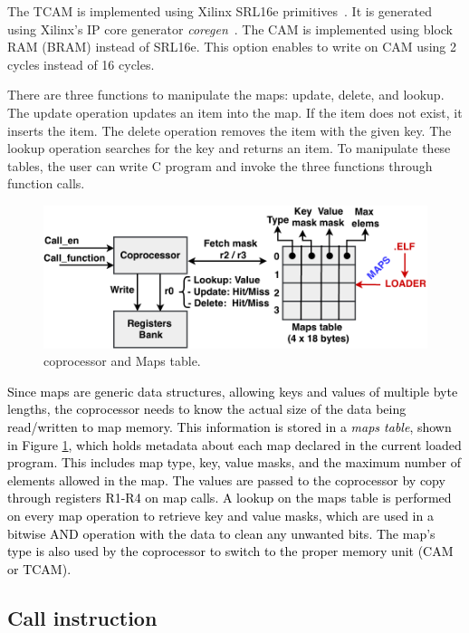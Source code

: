 The TCAM is implemented using Xilinx SRL16e primitives~\cite{xilinx_kylelocke2011}.
It is generated using Xilinx's IP core generator \textit{coregen}~\cite{xilinx_core_generator_2018}. The CAM is implemented using block RAM (BRAM) instead of SRL16e. This option enables to write on CAM using 2 cycles instead of 16 cycles.

There are three functions to manipulate the maps: update, delete, and lookup. The update operation updates an item into the map. If the item does not exist, it inserts the item. The delete operation removes the item with the given key. The lookup operation searches for the key and returns an item.
To manipulate these tables, the user can write C program and invoke the three functions through function calls.

\begin{figure}[tb]
\centering
\includegraphics[width=1.\linewidth]{figures/coprocessor.pdf}
\caption{coprocessor and Maps table.}
\label{fig:coproc}
\end{figure}

\textcolor{black}{
Since maps are generic data structures, allowing keys and values of multiple byte lengths, the coprocessor needs to know the actual size of the data being read/written to map memory. This information is stored in a \textit{maps table}, shown in Figure \ref{fig:coproc}, which holds metadata about each map declared in the current loaded program. This includes map type, key, value masks, and the maximum number of elements allowed in the map. 
The values are passed to the coprocessor by copy through registers R1-R4 on map calls. A lookup on the maps table is performed on every map operation to retrieve key and value masks, which are used in a bitwise AND operation with the data to clean any unwanted bits. The map's type is also used by the coprocessor to switch to the proper memory unit (CAM or TCAM).
}

\subsection{Call instruction}

